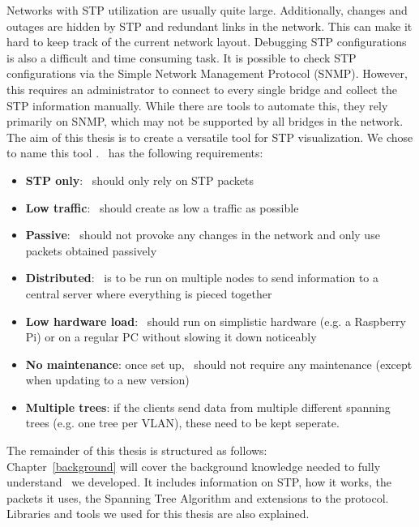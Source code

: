 Networks with STP utilization are usually quite large.
Additionally, changes and outages are hidden by STP and redundant links in the network.
This can make it hard to keep track of the current network layout.
Debugging STP configurations is also a difficult and time consuming task.
It is possible to check STP configurations via the Simple Network Management Protocol (SNMP).
However, this requires an administrator to connect to every single bridge and collect the STP information manually.
While there are tools to automate this, they rely primarily on SNMP, which may not be supported by all bridges in the network.\\

The aim of this thesis is to create a versatile tool for STP visualization.
We chose to name this tool \textit{\tool}.
\tool\ has the following requirements:
\begin{itemize}
    \item \textbf{STP only}: \tool\ should only rely on STP packets
    \item \textbf{Low traffic}: \tool\ should create as low a traffic as possible
    \item \textbf{Passive}: \tool\ should not provoke any changes in the network and only use packets obtained passively
    \item \textbf{Distributed}: \tool\ is to be run on multiple nodes to send information to a central server where everything is pieced together
    \item \textbf{Low hardware load}: \tool\ should run on simplistic hardware (e.g. a Raspberry Pi) or on a regular PC without slowing it down noticeably
    \item \textbf{No maintenance}: once set up, \tool\ should not require any maintenance (except when updating to a new version)
    \item \textbf{Multiple trees}: if the clients send data from multiple different spanning trees (e.g. one tree per VLAN), these need to be kept seperate.
    \label{requirements}
\end{itemize}

The remainder of this thesis is structured as follows:\\
Chapter~\ref{background} will cover the background knowledge needed to fully understand \tool\ we developed.
It includes information on STP, how it works, the packets it uses, the Spanning Tree Algorithm and extensions to the protocol.
Libraries and tools we used for this thesis are also explained.

